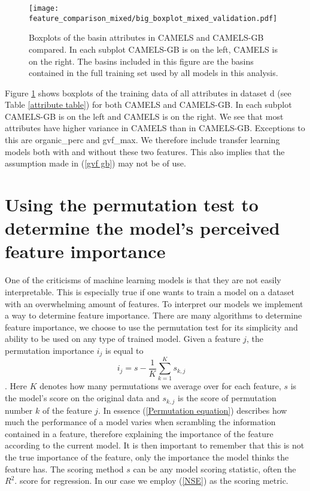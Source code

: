 \begin{figure}
    \centering
    \texttt{[image: feature\_comparison\_mixed/big\_boxplot\_mixed\_validation.pdf]}
    \caption{Boxplots of the basin attributes in CAMELS and CAMELS-GB compared. 
    In each subplot CAMELS-GB is on the left, CAMELS is on the right. The basins included in this 
    figure are the basins contained in the full training set used by all models 
    in this analysis.}
    \label{attribute comparison}
\end{figure}
Figure \ref{attribute comparison} shows boxplots of the training data of all attributes 
in dataset d (see Table 
\ref{attribute table}) for both CAMELS and CAMELS-GB. In each subplot CAMELS-GB is 
on the left and CAMELS is on the right. We see that most attributes have higher 
variance in CAMELS than in CAMELS-GB. Exceptions to this are organic\_perc and gvf\_max. 
We therefore include transfer learning models both with and without these two features. 
This also implies that the assumption made in (\ref{gvf gb}) may not be of use.
\section{Using the permutation test to determine the model's perceived feature importance}
\label{Feature selection}
One of the criticisms of machine learning models
is that they are not easily interpretable. This 
is especially true if one wants to train a model 
on a dataset with an overwhelming amount of 
features. 
 To interpret our models we implement a way to determine feature importance. There 
are many algorithms to determine feature importance, we choose to use the permutation 
test for its simplicity and ability to be used on any type of trained model.
Given a feature $j$, the permutation importance 
$i_j$ is equal to 
\begin{equation}
i_j = s - \frac{1}{K} \sum_{k=1}^K s_{k,j}\quad 
\label{Permutation equation}
\end{equation}
\citep{permutation,breiman2001random}.
Here $K$ denotes how many permutations we average over for each feature, $s$ is
the model's score on the original data and $s_{k,j}$ is the score of permutation 
number $k$ of the feature $j$. In essence (\ref{Permutation equation}) describes 
how much the performance of a model varies when scrambling the information 
contained in a feature, therefore explaining the importance of the feature 
according to the current model. It is then important to remember that this is not 
the true importance of the feature, only the importance the model thinks the feature 
has. The scoring method $s$ can be any model scoring statistic, often the $R^2$. 
score for regression.
In our case we employ (\ref{NSE}) as the scoring metric.

